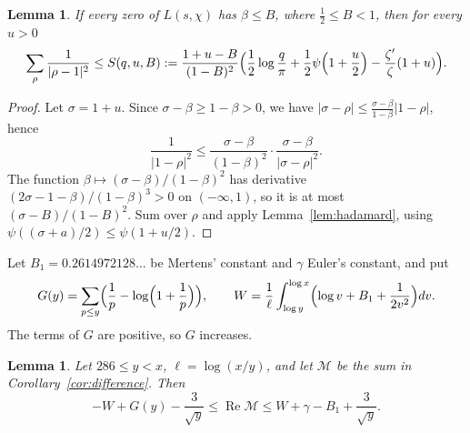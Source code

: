 \documentclass[11pt]{amsart}
\newtheorem{lemma}[theorem]{Lemma}
\theoremstyle{definition}
\theoremstyle{remark}
\numberwithin{equation}{section}
\renewcommand{\Re}{\operatorname{Re}}
\begin{document}
\begin{lemma}\label{lem:zerosum}
If every zero of $L(s,\chi)$ has $\beta\le B$, where $\tfrac12\le B<1$, then for every $u>0$
\[
\sum_\rho\frac1{|\rho-1|^2}\le S(q,u,B):=\frac{1+u-B}{(1-B)^2}\Bigl(\frac12\log\frac q\pi+\frac12\psi\Bigl(1+\frac u2\Bigr)-\frac{\zeta'}{\zeta}(1+u)\Bigr).
\]
\end{lemma}

\begin{proof}
Let $\sigma=1+u$. Since $\sigma-\beta\ge1-\beta>0$, we have $|\sigma-\rho|\le\frac{\sigma-\beta}{1-\beta}|1-\rho|$, hence
\[
\frac1{|1-\rho|^2}\le\frac{\sigma-\beta}{(1-\beta)^2}\cdot\frac{\sigma-\beta}{|\sigma-\rho|^2}.
\]
The function $\beta\mapsto(\sigma-\beta)/(1-\beta)^2$ has derivative $(2\sigma-1-\beta)/(1-\beta)^3>0$ on $(-\infty,1)$, so it is at most $(\sigma-B)/(1-B)^2$. Sum over $\rho$ and apply Lemma~\ref{lem:hadamard}, using $\psi((\sigma+a)/2)\le\psi(1+u/2)$.
\end{proof}

Let $B_1=0.2614972128\ldots$ be Mertens' constant and $\gamma$ Euler's constant, and put
\[
G(y)=\sum_{p\le y}\Bigl(\frac1p-\log\Bigl(1+\frac1p\Bigr)\Bigr),\qquad W=\frac1\ell\int_{\log y}^{\log x}\Bigl(\log v+B_1+\frac1{2v^2}\Bigr)dv .
\]
The terms of $G$ are positive, so $G$ increases.

\begin{lemma}\label{lem:primes}
Let $286\le y<x$, $\ell=\log(x/y)$, and let $\mathcal M$ be the sum in Corollary~\ref{cor:difference}. Then
\[
-W+G(y)-\frac3{\sqrt y}\le\Re\mathcal M\le W+\gamma-B_1+\frac3{\sqrt y}.
\]
\end{lemma}
\end{document}
